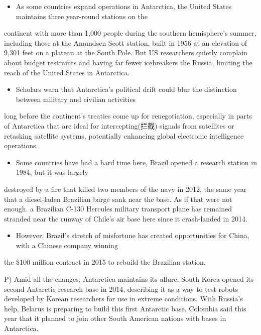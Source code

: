 \documentclass[UTF8,11pt]{ctexart}
\begin{document}
\begin{itemize}[leftmargin=2em,itemsep=.2em,topsep=.4em]\item[L.] As some countries expand operations in Antarctica, the United States maintains three year-round stations on the
\end{itemize}

continent with more than 1,000 people during the southern hemisphere’s summer, including those at the Amundsen Scott station, built in 1956 at an elevation of 9,301 feet on a plateau at the South Pole. But US researchers quietly complain about budget restraints and having far fewer icebreakers the Russia, limiting the reach of the United States in Antarctica.


\begin{itemize}[leftmargin=2em,itemsep=.2em,topsep=.4em]\item[M.] Scholars warn that Antarctica’s political drift could blur the distinction between military and civilian activities
\end{itemize}

long before the continent’s treaties come up for renegotiation, especially in parts of Antarctica that are ideal for intercepting(拦截) signals from satellites or retasking satellite systems, potentially enhancing global electronic intelligence operations.


\begin{itemize}[leftmargin=2em,itemsep=.2em,topsep=.4em]\item[N.] Some countries have had a hard time here, Brazil opened a research station in 1984, but it was largely
\end{itemize}

destroyed by a fire that killed two members of the navy in 2012, the same year that a diesel-laden Brazilian barge sank near the base. As if that were not enough. a Brazilian C-130 Hercules military transport plane has remained stranded near the runway of Chile’s air base here since it crash-landed in 2014.


\begin{itemize}[leftmargin=2em,itemsep=.2em,topsep=.4em]\item[O.] However, Brazil’s stretch of misfortune has created opportunities for China, with a Chinese company winning
\end{itemize}

the \$100 million contract in 2015 to rebuild the Brazilian station.


P) Amid all the changes, Antarctica maintains its allure. South Korea opened its second Antarctic research base in 2014, describing it as a way to test robots developed by Korean researchers for use in extreme conditions. With Russia’s help, Belarus is preparing to build this first Antarctic base. Colombia said this year that it planned to join other South American nations with bases in Antarctica.
\end{document}
